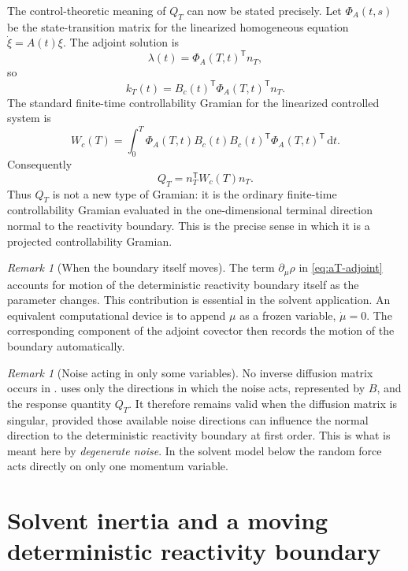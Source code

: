 \documentclass[11pt]{article}
\theoremstyle{definition}
\theoremstyle{remark}
\newtheorem{remark}[theorem]{Remark}
\newcommand{\dd}{\mathrm{d}}
\newcommand{\cT}{\mathsf{T}}
\begin{document}
The control-theoretic meaning of $Q_T$ can now be stated precisely.  Let $\Phi_A(t,s)$ be the state-transition matrix for the linearized homogeneous equation $\dot\xi=A(t)\xi$.  The adjoint solution is
\[
\lambda(t)=\Phi_A(T,t)^{\cT}n_T,
\]
so
\[
k_T(t)=B_c(t)^{\cT}\Phi_A(T,t)^{\cT}n_T.
\]
The standard finite-time controllability Gramian for the linearized controlled system is \cite{Sontag1998}
\begin{equation}
W_c(T)
=
\int_0^T
\Phi_A(T,t)B_c(t)B_c(t)^{\cT}\Phi_A(T,t)^{\cT}\,\dd t.
\label{eq:controllability-gramian}
\end{equation}
Consequently
\begin{equation}
Q_T=n_T^{\cT}W_c(T)n_T.
\label{eq:projected-gramian}
\end{equation}
Thus $Q_T$ is not a new type of Gramian: it is the ordinary finite-time controllability Gramian evaluated in the one-dimensional terminal direction normal to the reactivity boundary.  This is the precise sense in which it is a projected controllability Gramian.

\begin{remark}[When the boundary itself moves]
The term $\partial_\mu\rho$ in \eqref{eq:aT-adjoint} accounts for motion of the deterministic reactivity boundary itself as the parameter changes.  This contribution is essential in the solvent application.  An equivalent computational device is to append $\mu$ as a frozen variable, $\dot\mu=0$.  The corresponding component of the adjoint covector then records the motion of the boundary automatically.
\end{remark}

\begin{remark}[Noise acting in only some variables]
No inverse diffusion matrix occurs in .   uses only the directions in which the noise acts, represented by $B$, and the response quantity $Q_T$.  It therefore remains valid when the diffusion matrix is singular, provided those available noise directions can influence the normal direction to the deterministic reactivity boundary at first order.  This is what is meant here by \emph{degenerate noise}.  In the solvent model below the random force acts directly on only one momentum variable.
\end{remark}

\section{Solvent inertia and a moving deterministic reactivity boundary}
\label{sec:solvent-application}
\end{document}
